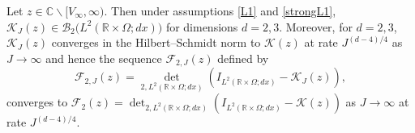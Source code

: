 \begin{theorem}\label{convergence} 
Let $z\in{{\mathbb{C}}}\backslash[V_{\infty},\infty)$. Then 
under assumptions \eqref{L1} and  \eqref{strongL1}, ${{\mathcal K}}_J(z)\in
{{\mathcal B}}_2\big(L^2({{\mathbb{R}}}\times\Omega; dx)\big)$
for dimensions $d=2,3$.  Moreover,
for $d=2,3$, ${{\mathcal K}}_J(z)$ converges in the
Hilbert--Schmidt norm to ${{\mathcal K}}(z)$ at rate $J^{(d-4)/4}$
as $J\to\infty$ and hence the sequence ${{\mathcal F}}_{2,J}(z)$ defined by 
\begin{equation}\label{FJ}
{{\mathcal F}}_{2,J}(z)= {\det}_{2,L^2({{\mathbb{R}}}\times\Omega; dx)}
(I_{L^2({{\mathbb{R}}}\times\Omega; dx)}- {{\mathcal K}}_J(z)), 
\end{equation}
converges to ${{\mathcal F}}_2(z)= {\det}_{2,L^2({{\mathbb{R}}}\times\Omega; dx)}
(I_{L^2({{\mathbb{R}}}\times\Omega; dx)}- {{\mathcal K}}(z))$ as
$J\to\infty$ at rate $J^{(d-4)/4}$.
\end{theorem}
